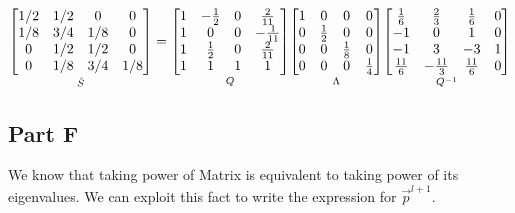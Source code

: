 \documentclass[12pt,a4paper]{article}
\begin{document}
$$
\underset{\Hat{S}}{
\begin{bmatrix}
    1/2 & 1/2 & 0   & 0  \\    
    1/8 & 3/4 & 1/8 & 0   \\    
     0  & 1/2 & 1/2 & 0   \\     
     0  & 1/8 & 3/4 & 1/8
\end{bmatrix}}
 = \underset{Q}{
\begin{bmatrix}
1 & -\frac{1}{2} & 0 & \frac{2}{11}\\
1 & 0 & 0 & -\frac{1}{11}\\
1 & \frac{1}{2} & 0 & \frac{2}{11}\\
1 & 1 & 1 & 1
\end{bmatrix}}\underset{\Lambda}{
\begin{bmatrix}
1 & 0 & 0 & 0\\
0 & \frac{1}{2} & 0 & 0\\
0 & 0 & \frac{1}{8} & 0\\
0 & 0 & 0 & \frac{1}{4}
\end{bmatrix}}\underset{Q^{-1}}{
\begin{bmatrix}\frac{1}{6}&\frac{2}{3}&\frac{1}{6}&0\\ -1&0&1&0\\ -1&3&-3&1\\ \frac{11}{6}&-\frac{11}{3}&\frac{11}{6}&0\end{bmatrix}}
$$

\subsection{Part F}

We know that taking power of Matrix is equivalent to taking power of its eigenvalues. We can exploit this fact to write the expression for $\Vec{p}^{l+1}$.
\end{document}

